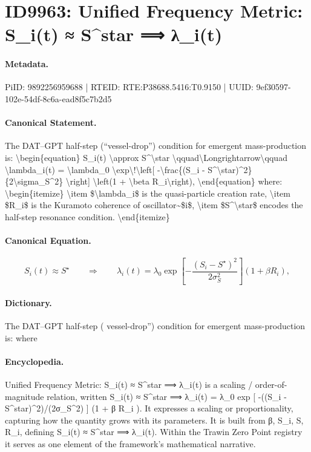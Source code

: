 \section*{ID9963: Unified Frequency Metric: S\_i(t) ≈ S\textasciicircum{}star ⟹ λ\_i(t)}
\paragraph{Metadata.}
PiID: 9892256959688 | RTEID: RTE:P38688.5416:T0.9150 | UUID: 9ef30597-102e-54df-8c6a-ead8f5c7b2d5

\paragraph{Canonical Statement.}
The DAT--GPT half-step (``vessel-drop'') condition for emergent mass-production is: \textbackslash{}begin\{equation\} S\_i(t) \textbackslash{}approx S\textasciicircum{}\textbackslash{}star \textbackslash{}qquad\textbackslash{}Longrightarrow\textbackslash{}qquad \textbackslash{}lambda\_i(t) = \textbackslash{}lambda\_0 \textbackslash{}exp\textbackslash{}!\textbackslash{}left[ -\textbackslash{}frac\{(S\_i - S\textasciicircum{}\textbackslash{}star)\textasciicircum{}2\}\{2\textbackslash{}sigma\_S\textasciicircum{}2\} \textbackslash{}right] \textbackslash{}left(1 + \textbackslash{}beta R\_i\textbackslash{}right), \textbackslash{}end\{equation\} where: \textbackslash{}begin\{itemize\} \textbackslash{}item \$\textbackslash{}lambda\_i\$ is the quasi-particle creation rate, \textbackslash{}item \$R\_i\$ is the Kuramoto coherence of oscillator\textasciitilde{}\$i\$, \textbackslash{}item \$S\textasciicircum{}\textbackslash{}star\$ encodes the half-step resonance condition. \textbackslash{}end\{itemize\}

\paragraph{Canonical Equation.}
\[
S_i(t) \approx S^\star \qquad\Longrightarrow\qquad \lambda_i(t) = \lambda_0 \exp\!\left[ -\frac{(S_i - S^\star)^2}{2\sigma_S^2} \right] \left(1 + \beta R_i\right),
\]

\paragraph{Dictionary.}
The DAT--GPT half-step ( vessel-drop'') condition for emergent mass-production is: where

\paragraph{Encyclopedia.}
Unified Frequency Metric: S\_i(t) ≈ S\textasciicircum{}star ⟹ λ\_i(t) is a scaling / order-of-magnitude relation, written S\_i(t) ≈ S\textasciicircum{}star ⟹ λ\_i(t) = λ\_0 exp [ -((S\_i - S\textasciicircum{}star)\textasciicircum{}2)/(2σ\_S\textasciicircum{}2) ] (1 + β R\_i ). It expresses a scaling or proportionality, capturing how the quantity grows with its parameters. It is built from β, S\_i, S, R\_i, defining S\_i(t) ≈ S\textasciicircum{}star ⟹ λ\_i(t). Within the Trawin Zero Point registry it serves as one element of the framework's mathematical narrative.
